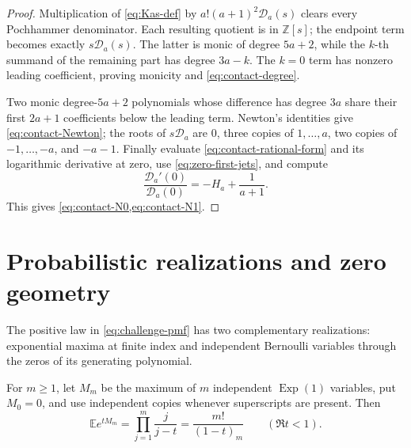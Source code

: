 \documentclass[11pt]{article}
\theoremstyle{keio}
\theoremstyle{definition}
\theoremstyle{remark}
\newcommand{\Z}{\mathbb Z}
\begin{document}
\begin{proof}
Multiplication of \eqref{eq:Kas-def} by
\(a!(a+1)^2\mathscr D_a(s)\) clears every Pochhammer denominator.  Each
resulting quotient is in \(\Z[s]\); the endpoint term becomes exactly
\(s\mathscr D_a(s)\).  The latter is monic of degree \(5a+2\), while the
\(k\)-th summand of the remaining part has degree \(3a-k\).  The \(k=0\)
term has nonzero leading coefficient, proving monicity and
\eqref{eq:contact-degree}.

Two monic degree-\(5a+2\) polynomials whose difference has degree \(3a\)
share their first \(2a+1\) coefficients below the leading term.  Newton's
identities give \eqref{eq:contact-Newton}; the roots of
\(s\mathscr D_a\) are \(0\), three copies of \(1,\ldots,a\), two copies of
\(-1,\ldots,-a\), and \(-a-1\).  Finally evaluate
\eqref{eq:contact-rational-form} and its logarithmic derivative at zero,
use \eqref{eq:zero-first-jets}, and compute
\[
 \frac{\mathscr D_a'(0)}{\mathscr D_a(0)}
 =-H_a+\frac1{a+1}.
\]
This gives \cref{eq:contact-N0,eq:contact-N1}.
\end{proof}

\section{Probabilistic realizations and zero geometry}
\label{sec:ram-probability}

The positive law in \eqref{eq:challenge-pmf} has two complementary
realizations: exponential maxima at finite index and independent Bernoulli
variables through the zeros of its generating polynomial.

For \(m\ge1\), let \(M_m\) be the maximum of \(m\) independent
\(\operatorname{Exp}(1)\) variables, put \(M_0=0\), and use independent
copies whenever superscripts are present.  Then
\begin{equation}\label{eq:maxima-mgf}
 \mathbb Ee^{tM_m}=\prod_{j=1}^m\frac j{j-t}
 =\frac{m!}{(1-t)_m}\qquad(\Re t<1).
\end{equation}
\end{document}
